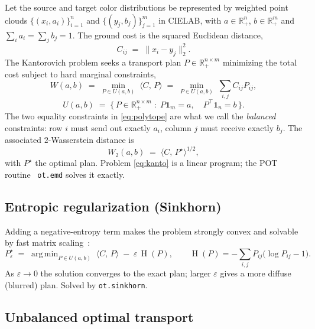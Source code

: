 \documentclass[11pt,a4paper]{article}
\newcommand{\R}{\mathbb{R}}
\newcommand{\one}{\mathbf{1}}
\newcommand{\Ent}{\operatorname{H}}
\newcommand{\inner}[2]{\langle #1,\, #2 \rangle}
\newcommand{\code}[1]{\texttt{#1}}
\DeclareMathOperator*{\argmin}{arg\,min}
\begin{document}
Let the source and target color distributions be represented by weighted point
clouds $\{(x_i, a_i)\}_{i=1}^{n}$ and $\{(y_j, b_j)\}_{j=1}^{m}$ in CIELAB,
with $a \in \R_+^n$, $b \in \R_+^m$ and $\sum_i a_i = \sum_j b_j = 1$.
The ground cost is the squared Euclidean distance,
\begin{equation}
  C_{ij} \;=\; \lVert x_i - y_j \rVert_2^2 .
\end{equation}
The Kantorovich problem seeks a transport plan
$P \in \R_+^{n \times m}$ minimizing the total cost subject to hard marginal
constraints,
\begin{equation}
  \label{eq:kanto}
  W(a,b) \;=\; \min_{P \in U(a,b)} \; \inner{C}{P}
  \;=\; \min_{P \in U(a,b)} \; \sum_{i,j} C_{ij} P_{ij},
\end{equation}
\begin{equation}
  \label{eq:polytope}
  U(a,b) \;=\; \bigl\{\, P \in \R_+^{n\times m}
  \;:\; P\one_m = a,\quad P^\top \one_n = b \,\bigr\}.
\end{equation}
The two equality constraints in \cref{eq:polytope} are what we call the
\emph{balanced} constraints: row $i$ must send out exactly $a_i$, column $j$ must
receive exactly $b_j$. The associated $2$-Wasserstein distance is
\begin{equation}
  W_2(a,b) \;=\; \inner{C}{P^\star}^{1/2},
\end{equation}
with $P^\star$ the optimal plan. Problem \cref{eq:kanto} is a linear program; the
POT routine~\cite{pot2021} \code{ot.emd} solves it exactly.

\subsection{Entropic regularization (Sinkhorn)}

Adding a negative-entropy term makes the problem strongly convex and solvable by
fast matrix scaling~\cite{cuturi2013}:
\begin{equation}
  \label{eq:sinkhorn}
  P^\star_\varepsilon
  \;=\; \argmin_{P \in U(a,b)} \; \inner{C}{P} \;-\; \varepsilon\, \Ent(P),
  \qquad
  \Ent(P) = -\sum_{i,j} P_{ij}\bigl(\log P_{ij} - 1\bigr).
\end{equation}
As $\varepsilon \to 0$ the solution converges to the exact plan; larger
$\varepsilon$ gives a more diffuse (blurred) plan. Solved by \code{ot.sinkhorn}.

\subsection{Unbalanced optimal transport}
\end{document}
